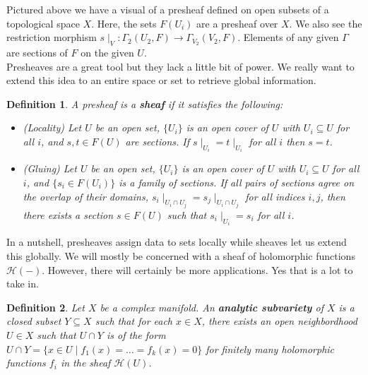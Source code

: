 \documentclass[12pt, letterpaper]{article}
\newtheorem{definition}{Definition}[section]
\newcommand{\ten}[1]{\textnormal{\textbf{#1}}}
\begin{document}
Pictured above we have a visual of a presheaf defined on open subsets of a topological
space $X$. Here, the sets $F(U_i)$ are a presheaf over $X$. We also see the restriction
morphism $s\mid_V: \Gamma_2(U_2,F) \to \Gamma_{V_2}(V_2,F)$. Elements of any given
$\Gamma$ are sections of $F$ on the given $U$.\\

Presheaves are a great tool but they lack a little bit of power. We really want 
to extend this idea to an entire space or set to retrieve global information.

\begin{definition}
    A presheaf is a \ten{sheaf} if it satisfies the following:
    \begin{itemize}
        \item (Locality) Let $U$ be an open set, $\{U_i\}$ is an open cover of $U$
        with $U_i \subseteq U$ for all $i$, and $s,t \in F(U)$ are sections. If
        $s\mid_{U_i} = t \mid_{U_i}$ for all $i$ then $s=t$.
        \item (Gluing) Let $U$ be an open set, $\{U_i\}$ is an open cover of $U$
        with $U_i \subseteq U$ for all $i$, and $\{s_i \in F(U_i)\}$ is a family
        of sections. If all pairs of sections agree on the overlap of their domains,
        $s_i\mid_{U_i\cap U_j} = s_j\mid_{U_i\cap U_j}$ for all indices $i,j$, then
        there exists a section $s\in F(U)$ such that $s_i\mid_{U_i} = s_i$ for all $i$.
    \end{itemize}
\end{definition}

In a nutshell, presheaves assign data to sets locally while sheaves let us extend
this globally. We will mostly be concerned with a sheaf of holomorphic functions
$\mathcal{H}(-)$. However, there will certainly be more applications. Yes that is
a lot to take in.

\begin{definition}
    Let $X$ be a complex manifold. An \ten{analytic subvariety} of $X$ is a closed
    subset $Y \subseteq X$ such that for each $x \in X$, there exists an open neighbordhood
    $U \in X$ such that $U \cap Y$ is of the form 
    $U \cap Y = \{ x \in U \mid f_1(x) = \hdots = f_k(x) = 0\}$ for finitely many
    holomorphic functions $f_i$ in the sheaf $\mathcal{H}(U)$.
\end{definition}
\end{document}

